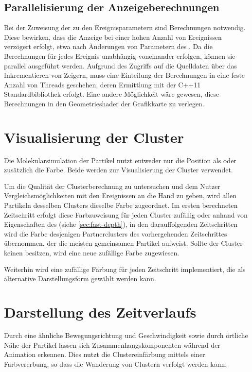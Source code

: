 
\subsection*{Parallelisierung der Anzeigeberechnungen}
Bei der Zuweisung der  zu den Ereignisparametern sind Berechnungen notwendig. Diese bewirken, dass die Anzeige bei einer hohen Anzahl von Ereignissen verzögert erfolgt, etwa nach Änderungen von Parametern des . Da die Berechnungen für jedes Ereignis unabhängig voneinander erfolgen, können sie parallel ausgeführt werden. Aufgrund des Zugriffs auf die Quelldaten über das Inkrementieren von Zeigern, muss eine Einteilung der Berechnungen in eine feste Anzahl von Threads geschehen, deren Ermittlung mit der C++11 Standardbibliothek  erfolgt. Eine andere Möglichkeit wäre gewesen, diese Berechnungen in den Geometrieshader der Grafikkarte zu verlegen.


\section{Visualisierung der Cluster}\label{sec:visualisierung:cluster}
Die  Molekularsimulation der Partikel nutzt entweder nur die Position als  oder zusätzlich die Farbe. Beide werden zur Visualisierung der Cluster verwendet.

Um die Qualität der Clusterberechnung zu untersuchen und dem Nutzer Vergleichsmöglichkeiten mit den Ereignissen an die Hand zu geben, wird allen Partikeln desselben Clusters dieselbe Farbe zugeordnet. Im ersten berechneten Zeitschritt erfolgt diese Farbzuweisung für jeden Cluster zufällig oder anhand von Eigenschaften des  (siehe \autoref{sec:fast-depth}), in den darauffolgenden Zeitschritten wird die Farbe desjenigen Partnerclusters des vorhergehenden Zeitschrittes übernommen, der die meisten gemeinsamen Partikel aufweist. Sollte der Cluster keinen  besitzen, wird eine neue zufällige Farbe zugewiesen.

Weiterhin wird eine zufällige Färbung für jeden Zeitschritt implementiert, die als alternative Darstellungsform gewählt werden kann.

\section{Darstellung des Zeitverlaufs}
Durch eine ähnliche Bewegungsrichtung und Geschwindigkeit sowie durch örtliche Nähe der Partikel lassen sich Zusammenhangskomponenten während der Animation erkennen. Dies nutzt die Clustereinfärbung mittels einer Farbvererbung, so dass die Wanderung von Clustern verfolgt werden kann.

